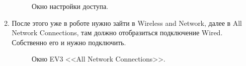 \documentclass[12pt,a4paper,openany]{extarticle}
\begin{document}
\begin{enumerate}
\begin{figure}[h]
	\noindent{}
	\caption{Окно настройки доступа.}
	\label{Properties}
\end{figure}

\item После этого уже в роботе нужно зайти в Wireless and Network, далее в All Network Connections, там должно отобразиться подключение Wired. Собственно его и нужно подключить.

\begin{figure}[h!]
	\noindent{}
	\caption{Окно EV3 <<All Network Connections>>.}
	\label{networking_EV3}
\end{figure}

\end{enumerate}
\end{document}
